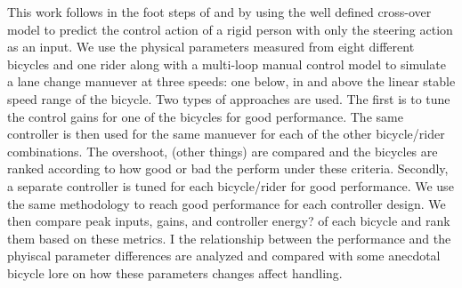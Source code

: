 \documentclass{bmd2010a}
\begin{document}
This work follows in the foot
steps of \cite{Weir1972} and \cite{Lunteren1970} by using the well defined
cross-over model to predict the control action of a rigid person with only the
steering action as an input. We use the physical parameters measured from eight
different bicycles and one rider along with a multi-loop manual control model to simulate a
lane change manuever at three speeds: one below, in and above the linear stable
speed range of the bicycle. Two types of approaches are used. The first is to
tune the control gains for one of the bicycles for good performance. The same
controller is then used for the same manuever for each of the other
bicycle/rider combinations. The overshoot, (other things) are compared and the
bicycles are ranked according to how good or bad the perform under these
criteria. Secondly, a separate controller is tuned for each bicycle/rider for
good performance. We use the same methodology to reach good performance for
each controller design. We then compare peak inputs, gains, and controller
energy? of each bicycle and rank them based on these metrics. I the
relationship between the performance and the phyiscal parameter differences are
analyzed and compared with some anecdotal bicycle lore on how these parameters
changes affect handling.
\end{document}
